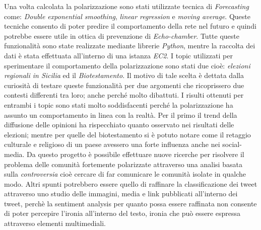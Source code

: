 \begin{spacing}{1.0}
\begin{itemize}
\end{itemize}
Una volta calcolata la polarizzazione sono stati utilizzate tecnica di \textit{Forecasting} come: \textit{Double exponential smoothing}, \textit{linear regression} e \textit{moving average}. Queste tecniche consento di poter predire il comportamento della rete nel futuro e quindi potrebbe essere utile in ottica di prevenzione di \textit{Echo-chamber}. Tutte queste funzionalità sono state realizzate mediante librerie \textit{Python}, mentre la raccolta dei dati è stata effettuata all'interno di una istanza \textit{EC2}.
I topic utilizzati per sperimentare il comportamento della polarizzazione sono stati due cioè: \textit{elezioni regionali in Sicilia} ed il \textit{Biotestamento}. Il motivo di tale scelta è dettata dalla curiosità di testare queste funzionalità per due argomenti che ricoprissero due contesti differenti tra loro; anche perché molto dibattuti. I risulti ottenuti per entrambi i topic sono stati molto soddisfacenti perché la polarizzazione ha assunto un comportamento in linea con la realtà. Per il primo il trend della diffusione delle opinioni ha rispecchiato quanto osservato nei risultati delle elezioni; mentre per quelle del biotestamento si è potuto notare come il retaggio culturale e religioso di un paese avessero una forte influenza anche nei social-media. 
Da questo progetto è possibile effettuare nuove ricerche per risolvere il problema delle comunità fortemente polarizzate attraverso una analisi basata sulla \textit{controversia} cioè cercare di far comunicare le comunità isolate in qualche modo. Altri spunti potrebbero essere quello di raffinare la classificazione dei tweet attraverso uno studio delle immagini, media e link pubblicati all'interno dei tweet, perchè la sentiment analysis per quanto possa essere raffinata non consente di poter percepire l'ironia all'interno del testo, ironia che può essere espressa attraverso elementi multimediali.
\end{spacing}